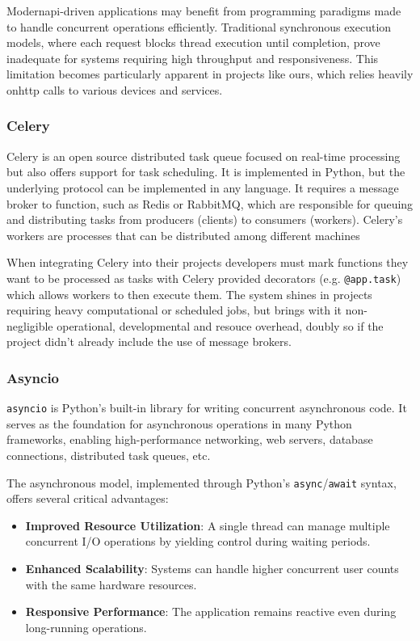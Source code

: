     Modern\ac{api}-driven applications may benefit from programming paradigms made to handle concurrent operations efficiently. Traditional 
    synchronous execution models, where each request blocks thread execution until completion, prove inadequate for systems requiring high 
    throughput and responsiveness. This limitation becomes particularly apparent in projects like ours, which relies heavily on\ac{http} 
    calls to various devices and services.

    \subsubsection{Celery}
      Celery is an open source distributed task queue focused on real-time processing but also offers support for task scheduling.
      It is implemented in Python, but the underlying protocol can be implemented in any language. It requires a message broker 
      to function, such as Redis or RabbitMQ, which are responsible for queuing and distributing tasks from producers (clients) to 
      consumers (workers). Celery's workers are processes that can be distributed among different machines

      When integrating Celery into their projects developers must mark functions they want to be processed as tasks with Celery provided 
      decorators (e.g. \texttt{@app.task}) which allows workers to then execute them. The system shines in projects requiring 
      heavy computational or scheduled jobs, but brings with it non-negligible operational, developmental and resouce overhead, doubly so if 
      the project didn't already include the use of message brokers.
      
    \subsubsection{Asyncio}

      \texttt{asyncio} is Python's built-in library for writing concurrent asynchronous code. It serves as the foundation for asynchronous operations 
      in many Python frameworks, enabling high-performance networking, web servers, database connections, distributed task queues, etc.

      The asynchronous model, implemented through Python's \texttt{async}/\texttt{await} syntax, offers several critical advantages:

      \begin{itemize}
          \item \textbf{Improved Resource Utilization}: A single thread can manage multiple concurrent I/O operations by yielding control during waiting periods.
          \item \textbf{Enhanced Scalability}: Systems can handle higher concurrent user counts with the same hardware resources.
          \item \textbf{Responsive Performance}: The application remains reactive even during long-running operations.
      \end{itemize}

